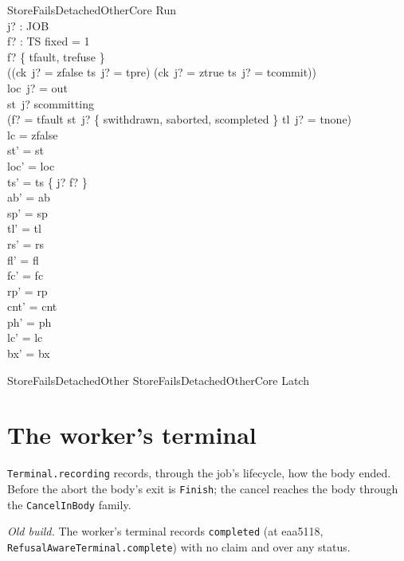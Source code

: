 \documentclass[a4paper,10pt,fleqn]{article}
\newcommand{\field}[1]{\texttt{#1}}
\begin{document}
\begin{schema}{StoreFailsDetachedOtherCore}
\Delta Run \\ j? : JOB \\ f? : TS
\where
fixed = 1 \\
f? \in \{ tfault, trefuse \} \\
((ck~j? = zfalse \land ts~j? = tpre) \lor (ck~j? = ztrue \land ts~j? = tcommit)) \\
loc~j? = out \\
st~j? \neq scommitting \\
(f? = tfault \lor st~j? \in \{ swithdrawn, saborted, scompleted \} \lor tl~j? = tnone) \\
lc = zfalse \\
st' = st \\
loc' = loc \\
ts' = ts \oplus \{ j? \mapsto f? \} \\
ab' = ab \\
sp' = sp \\
tl' = tl \\
rs' = rs \\
fl' = fl \\
fc' = fc \\
rp' = rp \\
cnt' = cnt \\
ph' = ph \\
lc' = lc \\
bx' = bx
\end{schema}

\begin{zed}
StoreFailsDetachedOther  StoreFailsDetachedOtherCore \land Latch
\end{zed}


\section{The worker's terminal}
\label{sec:terminal}

\field{Terminal.recording} records, through the job's lifecycle, how the
body ended. Before the abort the body's exit is \field{Finish}; the cancel
reaches the body through the \field{CancelInBody} family.

\emph{Old build.} The worker's terminal records \field{completed}
(at eaa5118, \field{RefusalAwareTerminal.complete}) with no claim and over any status.
\end{document}
